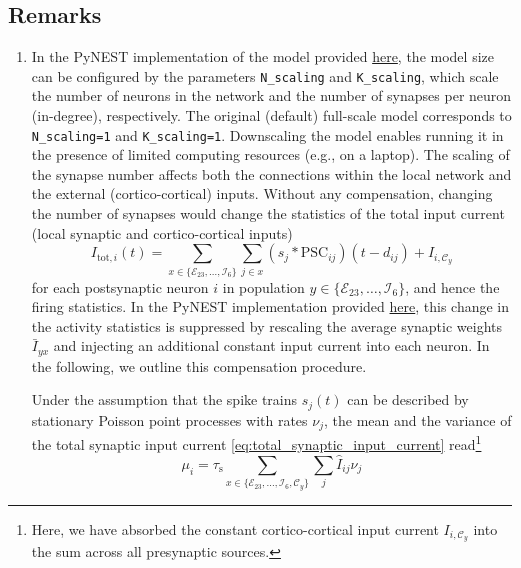 \documentclass[10pt,a4paper,twoside,american]{article}
\theoremstyle{definitionstyle}
\newcommand{\tauS}{\tau_\text{s}}
\begin{document}
\begin{appendices}
\section{Remarks}
\label{sec:remarks}
\begin{enumerate}
\item \label{remark:network_scaling}
  In the PyNEST implementation of the model provided \href{https://github.com/INM-6/microcircuit-PD14-model}{here}, the model size can be configured by the parameters \texttt{N\_scaling} and \texttt{K\_scaling}, which scale the number of neurons in the network and the number of synapses per neuron (in-degree), respectively. 
  The original (default) full-scale model corresponds to \texttt{N\_scaling=1} and \texttt{K\_scaling=1}.
  Downscaling the model enables running it in the presence of limited computing resources (e.g., on a laptop).
  The scaling of the synapse number affects both the connections within the local network and the external (cortico-cortical) inputs.
  Without any compensation, changing the number of synapses would change the statistics of the total input current (local synaptic and cortico-cortical inputs)
  \begin{equation}
    \label{eq:total_synaptic_input_current}
    I_{\text{tot},i}(t)=\sum_{x\in\{\mathcal{E}_{23},\ldots,\mathcal{I}_{6}\}} \sum_{j\in{}x} (s_j* \text{PSC}_{ij})(t-d_{ij}) + I_{i,\mathcal{C}_y}
  \end{equation}
  for each postsynaptic neuron $i$ in population $y\in\{\mathcal{E}_{23},\ldots,\mathcal{I}_{6}\}$, and hence the firing statistics.
  In the PyNEST implementation provided \href{https://github.com/INM-6/microcircuit-PD14-model}{here}, this change in the activity statistics is suppressed by rescaling the average synaptic weights $\bar{I}_{yx}$ and injecting an additional constant input current into each neuron.
  In the following, we outline this compensation procedure.
  \par  
  Under the assumption that the spike trains $s_j(t)$ can be described by stationary Poisson point processes with rates $\nu_j$, the mean and the variance of the total synaptic input current \cref{eq:total_synaptic_input_current} read\footnote{Here, we have absorbed the constant cortico-cortical input current $I_{i,\mathcal{C}_y}$ into the sum across all presynaptic sources.}
  \begin{equation}
    \label{eq:mean_and_variances_synaptic_input}
      \mu_i      =             \tauS \sum_{x\in\{\mathcal{E}_{23},\ldots,\mathcal{I}_{6},\mathcal{C}_y\}} \sum_j \hat{I}_{ij}   \nu_j 

\end{equation}
\end{enumerate}
\end{appendices}
\end{document}
